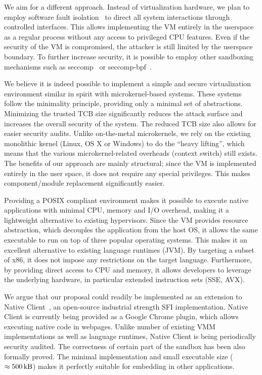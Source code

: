 We aim for a different approach. Instead of virtualization hardware, we
plan to employ software fault isolation~\cite{wahbe:sosp93} to direct
all system interactions through controlled interfaces. This allows
implementing the VM entirely in the userspace as a regular process
without any access to privileged CPU features. Even if the security of
the VM is compromised, the attacker is still limited by the userspace
boundary. To further increase security, it is possible to employ other
sandboxing mechanisms such as seccomp~\cite{seccomp} or
seccomp-bpf~\cite{seccomp-bpf}.

We believe it is indeed possible to implement a simple and secure
virtualization environment similar in spirit with microkernel-based
systems. These systems follow the minimality principle, providing only a
minimal set of abstractions. Minimizing the trusted TCB size
significantly reduces the attack surface and increases the overall
security of the system. The reduced TCB size also allows for easier
security audits. Unlike on-the-metal microkernels, we rely on the
existing monolithic kernel (\ie Linux, OS X or Windows) to do the
``heavy lifting'', which means that the various microkernel-related
overheads (\eg context switch) still exists. The benefits of our
approach are mainly structural; since the VM is implemented entirely in
the user space, it does not require any special privileges. This makes
component/module replacement significantly easier.

Providing a POSIX compliant environment makes it possible to execute
native applications with minimal CPU, memory and I/O overhead,
making it a lightweight alternative to existing hypervisors.  Since the
VM provides resource abstraction, which decouples the application from the
host OS, it allows the same executable to run on top of three popular
operating systems. This makes it an excellent alternative to existing
language runtimes (\eg JVM). By targeting a subset of x86, it does not
impose any restrictions on the target language.  Furthermore, by
providing direct access to CPU and memory, it allows developers to
leverage the underlying hardware, in particular extended instruction
sets (\eg SSE, AVX).


We argue that our proposal could readily be implemented as an extension
to Native Client~\cite{yee:ieee-sp09}, an open-source industrial
strength SFI implementation. Native Client is currently being provided
as a Google Chrome plugin, which allows executing native code in
webpages. Unlike number of existing VMM implementations as well as
language runtimes, Native Client is being periodically security audited.
The correctness of certain part of the sandbox has been also formally
proved. The minimal implementation and small executable size
($\approx\SI{500}{\kilo\byte}$) makes it perfectly suitable for
embedding in other applications.

